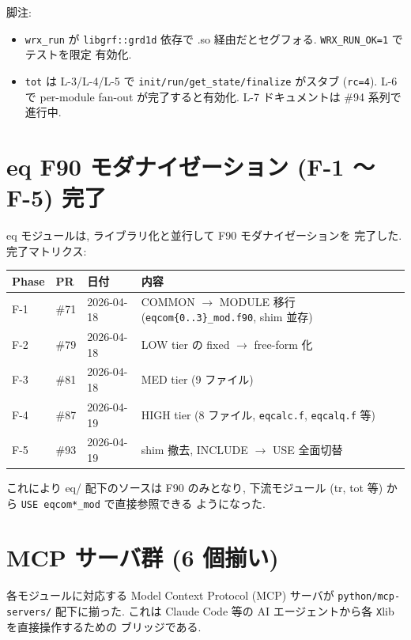 \documentclass[11pt,a4paper]{report}
\begin{document}
脚注:
\begin{itemize}[leftmargin=1.5em]
  \item[$^{1}$] \texttt{wrx\_run} が \texttt{libgrf::grd1d} 依存で
    .so 経由だとセグフォる. \texttt{WRX\_RUN\_OK=1} でテストを限定
    有効化.
  \item[$^{2}$] \texttt{tot} は L-3/L-4/L-5 で
    \texttt{init/run/get\_state/finalize} がスタブ
    (\texttt{rc=4}). L-6 で per-module fan-out が完了すると有効化.
    L-7 ドキュメントは \#94 系列で進行中.
\end{itemize}

\section{eq F90 モダナイゼーション (F-1 〜 F-5) 完了}

eq モジュールは, ライブラリ化と並行して F90 モダナイゼーションを
完了した. 完了マトリクス:

\begin{center}
\small
\begin{tabular}{@{}lllp{6.0cm}@{}}
\toprule
Phase & PR & 日付 & 内容 \\ \midrule
F-1 & \#71 & 2026-04-18 & COMMON $\to$ MODULE 移行 (\texttt{eqcom\{0..3\}\_mod.f90}, shim 並存) \\
F-2 & \#79 & 2026-04-18 & LOW tier の fixed $\to$ free-form 化 \\
F-3 & \#81 & 2026-04-18 & MED tier (9 ファイル) \\
F-4 & \#87 & 2026-04-19 & HIGH tier (8 ファイル, \texttt{eqcalc.f}, \texttt{eqcalq.f} 等) \\
F-5 & \#93 & 2026-04-19 & shim 撤去, INCLUDE $\to$ USE 全面切替 \\
\bottomrule
\end{tabular}
\end{center}

これにより eq/ 配下のソースは F90 のみとなり, 下流モジュール
(tr, tot 等) から \texttt{USE eqcom*\_mod} で直接参照できる
ようになった.

\section{MCP サーバ群 (6 個揃い)}

各モジュールに対応する Model Context Protocol (MCP) サーバが
\texttt{python/mcp-servers/} 配下に揃った. これは Claude Code
等の AI エージェントから各 \texttt{X}lib を直接操作するための
ブリッジである.
\end{document}
